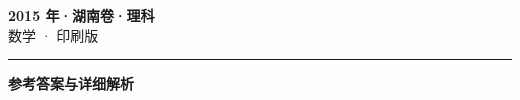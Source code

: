 \documentclass[zihao=5, a4paper]{ctexart}
\begin{document}
\begin{center}
  {\Large\bfseries 2015 年·湖南卷·理科}\\[4pt]
  {\large 数学 · 印刷版}
\end{center}
\medskip
{}

\par\bigskip\hrule\bigskip
{}
\begin{center}{\large\bfseries 参考答案与详细解析}\end{center}
\smallskip

\end{document}
